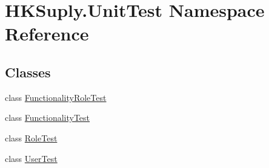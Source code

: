 \hypertarget{namespace_h_k_suply_1_1_unit_test}{}\section{H\+K\+Suply.\+Unit\+Test Namespace Reference}
\label{namespace_h_k_suply_1_1_unit_test}
\subsection*{Classes}
\begin{DoxyCompactItemize}
\item 
class \mbox{\hyperlink{class_h_k_suply_1_1_unit_test_1_1_functionality_role_test}{Functionality\+Role\+Test}}
\item 
class \mbox{\hyperlink{class_h_k_suply_1_1_unit_test_1_1_functionality_test}{Functionality\+Test}}
\item 
class \mbox{\hyperlink{class_h_k_suply_1_1_unit_test_1_1_role_test}{Role\+Test}}
\item 
class \mbox{\hyperlink{class_h_k_suply_1_1_unit_test_1_1_user_test}{User\+Test}}
\end{DoxyCompactItemize}
